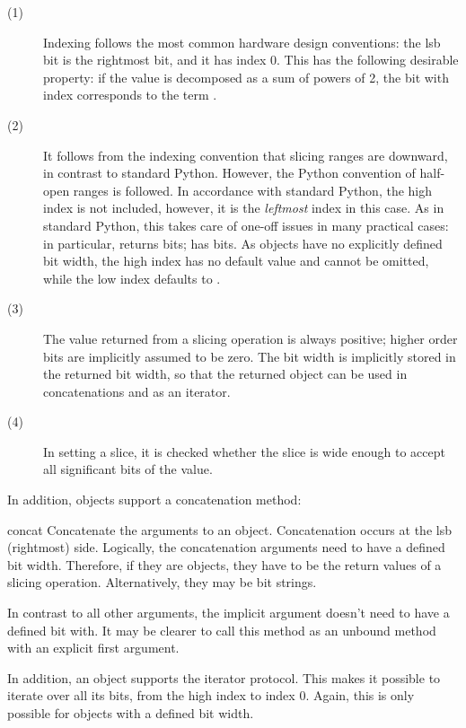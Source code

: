 \begin{description}
\item[(1)] Indexing follows the most common hardware design
	  conventions: the lsb bit is the rightmost bit, and it has
	  index 0. This has the following desirable property: if the
	   value is decomposed as a sum of powers of 2,
	  the bit with index  corresponds to the term
	  .

\item[(2)] It follows from the indexing convention that slicing ranges
	  are downward, in contrast to standard Python. However, the
	  Python convention of half-open ranges is followed. In
	  accordance with standard Python, the high index is not
	  included, however, it is the \emph{leftmost} index in this
	  case. As in standard Python, this takes care of one-off
	  issues in many practical cases: in particular,
	   returns  bits;
	   has 
	  bits. As  objects have no explicitly defined
	  bit width, the high index  has no default value and
	  cannot be omitted, while the low index  defaults to
	  .

\item[(3)] The value returned from a slicing operation is always
	  positive; higher order bits are implicitly assumed to be
	  zero. The bit width is implicitly stored in the returned bit
	  width, so that the returned object can be used in
	  concatenations and as an iterator.

\item[(4)] In setting a slice, it is checked whether the slice is wide
	  enough to accept all significant bits of the value.
\end{description}

In addition,  objects support a concatenation method:

\begin{methoddesc}[intbv]{concat}{}
Concatenate the arguments to an  object. Concatenation
occurs at the lsb (rightmost) side. Logically, the concatenation
arguments need to have a defined bit width. Therefore, if they are
 objects, they have to be the return values of a slicing
operation. Alternatively, they may be bit strings.

In contrast to all other arguments, the implicit  argument
doesn't need to have a defined bit with.  It may be clearer to call
this method as an unbound method with an explicit first 
argument.
\end{methoddesc}

In addition, an  object supports the iterator protocol. This
makes it possible to iterate over all its bits, from the high index to
index 0. Again, this is only possible for  objects with a
defined bit width.












